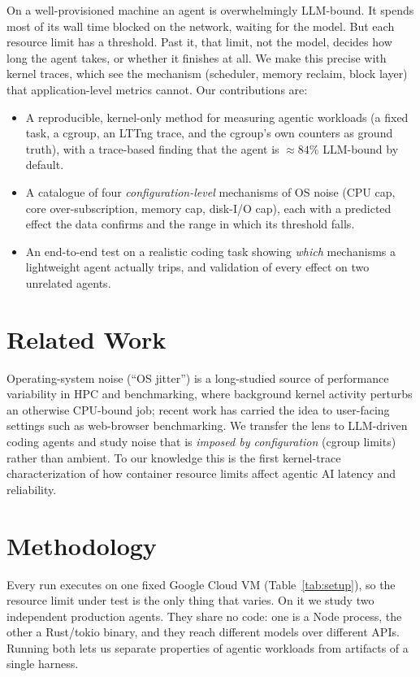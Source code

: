 \documentclass[10pt,twocolumn]{article}
\begin{document}
On a well-provisioned machine an agent is overwhelmingly LLM-bound. It
spends most of its wall time blocked on the network, waiting for the model.
But each resource limit has a threshold. Past it, that limit, not the model,
decides how long the agent takes, or whether it finishes at all. We make
this precise with kernel traces, which see the mechanism (scheduler, memory
reclaim, block layer) that application-level metrics cannot. Our
contributions are:
\begin{itemize}\itemsep0pt
  \item A reproducible, kernel-only method for measuring agentic workloads
  (a fixed task, a cgroup, an LTTng trace, and the cgroup's own counters as
  ground truth), with a trace-based finding that the agent is
  ${\approx}84\%$ LLM-bound by default.
  \item A catalogue of four \emph{configuration-level} mechanisms of OS
  noise (CPU cap, core over-subscription, memory cap, disk-I/O cap), each
  with a predicted effect the data confirms and the range in which its
  threshold falls.
  \item An end-to-end test on a realistic coding task showing \emph{which}
  mechanisms a lightweight agent actually trips, and validation of every
  effect on two unrelated agents.
\end{itemize}

\section{Related Work}

Operating-system noise (``OS jitter'') is a long-studied source of
performance variability in HPC and benchmarking, where background kernel
activity perturbs an otherwise CPU-bound job; recent work has carried the
idea to user-facing settings such as web-browser benchmarking. We transfer
the lens to LLM-driven coding agents and study noise that is \emph{imposed
by configuration} (cgroup limits) rather than ambient. To our knowledge this
is the first kernel-trace characterization of how container resource limits
affect agentic AI latency and reliability.

\section{Methodology}
\label{sec:method}

Every run executes on one fixed Google Cloud VM (Table~\ref{tab:setup}), so
the resource limit under test is the only thing that varies. On it we study
two independent production agents. They share no code: one is a Node
process, the other a Rust/tokio binary, and they reach different models over
different APIs. Running both lets us separate properties of agentic
workloads from artifacts of a single harness.
\end{document}
